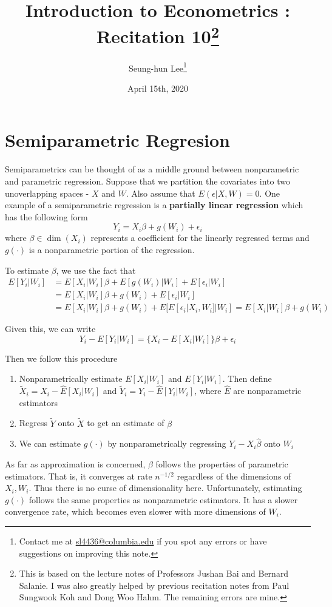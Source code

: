 \documentclass[12pt]{article}
\title{Introduction to Econometrics \ROM{2}: Recitation 10\footnote{This is based on the lecture notes of Professors Jushan Bai and Bernard Salanie. I was also greatly helped by previous recitation notes from Paul Sungwook Koh and Dong Woo Hahm. The remaining errors are mine. }}
\theoremstyle{definition}
\theoremstyle{property}
\theoremstyle{assumption}
\theoremstyle{example}
\theoremstyle{comment}
\begin{document}
\linespread{1.25}
\onehalfspacing

\author{Seung-hun Lee\footnote{Contact me at \href{mailto:sl4436@columbia.edu}{sl4436@columbia.edu} if you spot any errors or have suggestions on improving this note.}}
\date{April 15th, 2020}
\maketitle
\thispagestyle{firstpage}

\section{Semiparametric Regresion}
Semiparametrics can be thought of as a middle ground between nonparametric and parametric regression. Suppose that we partition the covariates into two unoverlapping spaces - $X$ and $W$. Also assume that $E(\epsilon|X,W)=0$. One example of a semiparametric regression is a \textbf{partially linear regression} which has the following form
\[
Y_i = X_i\beta + g(W_i)+\epsilon_i 
\]
where $\beta\in\dim{(X_i)} $ represents a coefficient for the linearly regressed terms and $g(\cdot)$ is a nonparametric portion of the regression.  \par
To estimate $\beta$, we use the fact that
\begin{align*}
E[Y_i|W_i]&=E[X_i|W_i]\beta + E[g(W_i)|W_i]+E[\epsilon_i|W_i]\\
&=E[X_i|W_i]\beta + g(W_i)+E[\epsilon_i|W_i]\\
&=E[X_i|W_i]\beta + g(W_i)+E[E[\epsilon_i|X_i,W_i]|W_i] = E[X_i|W_i]\beta +g(W_i)
\end{align*}\par
Given this, we can write
\[
Y_i-E[Y_i|W_i]=\{X_i-E[X_i|W_i]\}\beta +\epsilon_i
\]\par
Then we follow this procedure
\begin{enumerate}
\item Nonparametrically estimate $E[X_i|W_i]$ and $E[Y_i|W_i]$. Then define $\tilde{X}_i=X_i-\hat{E}[X_i|W_i]$ and $\tilde{Y}_i = Y_i-\hat{E}[Y_i|W_i]$, where $\hat{E}$ are nonparametric estimators
\item Regress $\tilde{Y}$ onto $\tilde{X}$ to get an estimate of $\beta$
\item We can estimate $g(\cdot)$ by nonparametrically regressing $Y_i-X_i\hat{\beta}$ onto $W_i$
\end{enumerate}
\par
As far as approximation is concerned, $\beta$ follows the properties of parametric estimators. That is, it converges at rate $n^{-1/2}$ regardless of the dimensions of $X_i, W_i$. Thus there is no curse of dimensionality here. Unfortunately, estimating $g(\cdot)$ follows the same properties as nonparametric estimators. It has a slower convergence rate, which becomes even slower with more dimensions of $W_i$. \par
\end{document}
